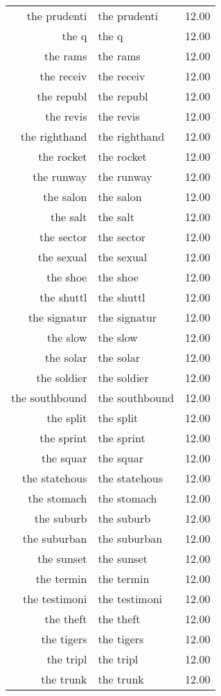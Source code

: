 \begin{table}[ht]
\begin{tabular}{rlr}
  the prudenti & the prudenti & 12.00 \\ 
  the q & the q & 12.00 \\ 
  the rams & the rams & 12.00 \\ 
  the receiv & the receiv & 12.00 \\ 
  the republ & the republ & 12.00 \\ 
  the revis & the revis & 12.00 \\ 
  the righthand & the righthand & 12.00 \\ 
  the rocket & the rocket & 12.00 \\ 
  the runway & the runway & 12.00 \\ 
  the salon & the salon & 12.00 \\ 
  the salt & the salt & 12.00 \\ 
  the sector & the sector & 12.00 \\ 
  the sexual & the sexual & 12.00 \\ 
  the shoe & the shoe & 12.00 \\ 
  the shuttl & the shuttl & 12.00 \\ 
  the signatur & the signatur & 12.00 \\ 
  the slow & the slow & 12.00 \\ 
  the solar & the solar & 12.00 \\ 
  the soldier & the soldier & 12.00 \\ 
  the southbound & the southbound & 12.00 \\ 
  the split & the split & 12.00 \\ 
  the sprint & the sprint & 12.00 \\ 
  the squar & the squar & 12.00 \\ 
  the statehous & the statehous & 12.00 \\ 
  the stomach & the stomach & 12.00 \\ 
  the suburb & the suburb & 12.00 \\ 
  the suburban & the suburban & 12.00 \\ 
  the sunset & the sunset & 12.00 \\ 
  the termin & the termin & 12.00 \\ 
  the testimoni & the testimoni & 12.00 \\ 
  the theft & the theft & 12.00 \\ 
  the tigers & the tigers & 12.00 \\ 
  the tripl & the tripl & 12.00 \\ 
  the trunk & the trunk & 12.00 \\ 

\end{tabular}
\end{table}

